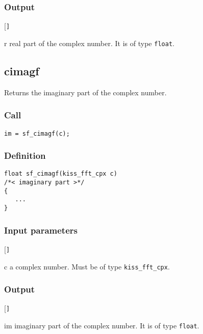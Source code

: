 \subsubsection*{Output}
\begin{desclist}{\tt }{\quad}[\tt ]
   \setlength\itemsep{0pt}
   \item[r] real part of the complex number. It is of type \texttt{float}.
\end{desclist}




\subsection{{cimagf}}
Returns the imaginary part of the complex number.

\subsubsection*{Call}
\begin{verbatim}im = sf_cimagf(c);\end{verbatim}

\subsubsection*{Definition}
\begin{verbatim}
float sf_cimagf(kiss_fft_cpx c)
/*< imaginary part >*/
{
   ...
}
\end{verbatim}

\subsubsection*{Input parameters}
\begin{desclist}{\tt }{\quad}[\tt ]
   \setlength\itemsep{0pt}
   \item[c]      a complex number. Must be of type \texttt{kiss\_fft\_cpx}.
\end{desclist}

\subsubsection*{Output}
\begin{desclist}{\tt }{\quad}[\tt ]
   \setlength\itemsep{0pt}
   \item[im] imaginary part of the complex number. It is of type \texttt{float}.
\end{desclist}




